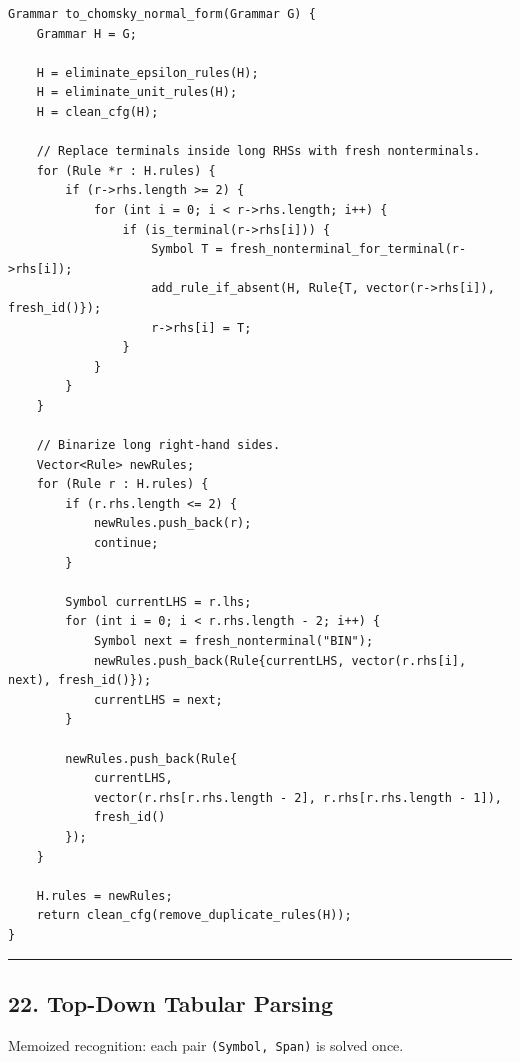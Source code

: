 \documentclass[10pt,letterpaper]{article}
\begin{document}
\begin{verbatim}
Grammar to_chomsky_normal_form(Grammar G) {
    Grammar H = G;

    H = eliminate_epsilon_rules(H);
    H = eliminate_unit_rules(H);
    H = clean_cfg(H);

    // Replace terminals inside long RHSs with fresh nonterminals.
    for (Rule *r : H.rules) {
        if (r->rhs.length >= 2) {
            for (int i = 0; i < r->rhs.length; i++) {
                if (is_terminal(r->rhs[i])) {
                    Symbol T = fresh_nonterminal_for_terminal(r->rhs[i]);
                    add_rule_if_absent(H, Rule{T, vector(r->rhs[i]), fresh_id()});
                    r->rhs[i] = T;
                }
            }
        }
    }

    // Binarize long right-hand sides.
    Vector<Rule> newRules;
    for (Rule r : H.rules) {
        if (r.rhs.length <= 2) {
            newRules.push_back(r);
            continue;
        }

        Symbol currentLHS = r.lhs;
        for (int i = 0; i < r.rhs.length - 2; i++) {
            Symbol next = fresh_nonterminal("BIN");
            newRules.push_back(Rule{currentLHS, vector(r.rhs[i], next), fresh_id()});
            currentLHS = next;
        }

        newRules.push_back(Rule{
            currentLHS,
            vector(r.rhs[r.rhs.length - 2], r.rhs[r.rhs.length - 1]),
            fresh_id()
        });
    }

    H.rules = newRules;
    return clean_cfg(remove_duplicate_rules(H));
}
\end{verbatim}

\medskip\hrule\medskip

\subsection*{22. Top-Down Tabular Parsing}

Memoized recognition: each pair \texttt{(Symbol, Span)} is solved once.
\end{document}
